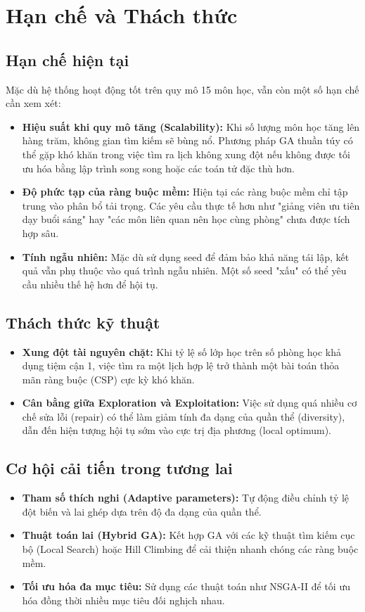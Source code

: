 \section{Hạn chế và Thách thức}

\subsection{Hạn chế hiện tại}
Mặc dù hệ thống hoạt động tốt trên quy mô 15 môn học, vẫn còn một số hạn chế cần xem xét:
\begin{itemize}
    \item \textbf{Hiệu suất khi quy mô tăng (Scalability):} Khi số lượng môn học tăng lên hàng trăm, không gian tìm kiếm sẽ bùng nổ. Phương pháp GA thuần túy có thể gặp khó khăn trong việc tìm ra lịch không xung đột nếu không được tối ưu hóa bằng lập trình song song hoặc các toán tử đặc thù hơn.
    \item \textbf{Độ phức tạp của ràng buộc mềm:} Hiện tại các ràng buộc mềm chỉ tập trung vào phân bổ tải trọng. Các yêu cầu thực tế hơn như "giảng viên ưu tiên dạy buổi sáng" hay "các môn liên quan nên học cùng phòng" chưa được tích hợp sâu.
    \item \textbf{Tính ngẫu nhiên:} Mặc dù sử dụng seed để đảm bảo khả năng tái lập, kết quả vẫn phụ thuộc vào quá trình ngẫu nhiên. Một số seed "xấu" có thể yêu cầu nhiều thế hệ hơn để hội tụ.
\end{itemize}

\subsection{Thách thức kỹ thuật}
\begin{itemize}
    \item \textbf{Xung đột tài nguyên chặt:} Khi tỷ lệ số lớp học trên số phòng học khả dụng tiệm cận 1, việc tìm ra một lịch hợp lệ trở thành một bài toán thỏa mãn ràng buộc (CSP) cực kỳ khó khăn.
    \item \textbf{Cân bằng giữa Exploration và Exploitation:} Việc sử dụng quá nhiều cơ chế sửa lỗi (repair) có thể làm giảm tính đa dạng của quần thể (diversity), dẫn đến hiện tượng hội tụ sớm vào cực trị địa phương (local optimum).
\end{itemize}

\subsection{Cơ hội cải tiến trong tương lai}
\begin{itemize}
    \item \textbf{Tham số thích nghi (Adaptive parameters):} Tự động điều chỉnh tỷ lệ đột biến và lai ghép dựa trên độ đa dạng của quần thể.
    \item \textbf{Thuật toán lai (Hybrid GA):} Kết hợp GA với các kỹ thuật tìm kiếm cục bộ (Local Search) hoặc Hill Climbing để cải thiện nhanh chóng các ràng buộc mềm.
    \item \textbf{Tối ưu hóa đa mục tiêu:} Sử dụng các thuật toán như NSGA-II để tối ưu hóa đồng thời nhiều mục tiêu đối nghịch nhau.
\end{itemize}
